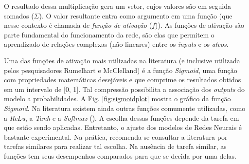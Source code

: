 

  

O resultado dessa multiplicação gera um vetor, cujos valores são em seguida somados ($\displaystyle\Sigma$). O valor resultante entra como argumento em uma função (que nesse contexto é chamada de \textit{função de ativação} ($f$)). As funções de ativação são parte fundamental do funcionamento da rede, são elas que permitem o aprendizado de relações complexas (não lineares) entre os \textit{inputs} e os \textit{alvos}. 

Uma das funções de ativação mais utilizadas na literatura (e inclusive utilizada pelos pesquisadores Rumelhart e McClelland) é a função \textit{Sigmoid}, uma função com propriedades matemáticas desejáveis e que comprime os resultados obtidos em um intervalo de [0, 1]. Tal compressão possibilita a associação dos \textit{outputs} do modelo a probabilidades. A Fig. \ref{fig:sigmoidplot} mostra o gráfico da função \textit{Sigmoid}. Na literatura existem ainda outras funções comumente utilizadas, como a \textit{ReLu}, a \textit{Tanh} e a \textit{Softmax}
(\cite{Goodfellow-et-al-2016}). A escolha dessas funções depende da tarefa em que estão sendo aplicadas. Entretanto, o ajuste dos modelos de Redes Neurais é bastante experimental. Na prática, recomenda-se consultar a literatura por tarefas similares para realizar tal escolha. Na ausência de tarefa similar, as funções tem seus desempenhos comparados para que se decida por uma delas. 

